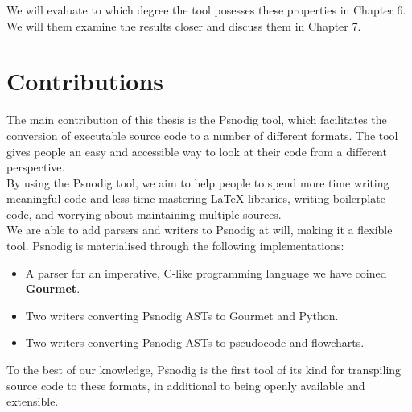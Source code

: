 We will evaluate to which degree the tool posesses these properties in Chapter 6. We will them examine the results closer and discuss them in Chapter 7.

\section{Contributions}

The main contribution of this thesis is the Psnodig tool, which facilitates the conversion of executable source code to a number of different formats. The tool gives people an easy and accessible way to look at their code from a different perspective. \\

By using the Psnodig tool, we aim to help people to spend more time writing meaningful code and less time mastering LaTeX libraries, writing boilerplate code, and worrying about maintaining multiple sources. \\

We are able to add parsers and writers to Psnodig at will, making it a flexible tool. Psnodig is materialised through the following implementations:

\begin{itemize}
    \item A parser for an imperative, C-like programming language we have coined \textbf{Gourmet}.
    \item Two writers converting Psnodig ASTs to Gourmet and Python.
    \item Two writers converting Psnodig ASTs to pseudocode and flowcharts.
\end{itemize}

To the best of our knowledge, Psnodig is the first tool of its kind for transpiling source code to these formats, in additional to being openly available and extensible.



